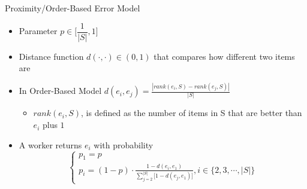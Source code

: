 \documentclass{beamer}
\begin{document}
\begin{frame}{Proximity/Order-Based Error Model}
\begin{itemize}
	\vspace{-5pt}
	\item Parameter $p \in \Bigg[ \dfrac{1}{\left\vert{S}\right\vert} , 1\Bigg]$
	\pause
	\vspace{5pt}
	\item Distance function $d(\cdot,\cdot) \in (0,1)$ that compares how different two items are
	\vspace{5pt}
	\item In Order-Based Model $d(e_i,e_j) = \frac{\left\vert{ rank(e_i, S)-rank(e_j, S) }\right\vert}{\left\vert{S}\right\vert}$
		\begin{itemize}
			 \item $rank(e_i, S)$, is defined as the number of items in S that are better than $e_i$ plus $1$
		\end{itemize}
\vspace{5pt}
\pause
\item A worker returns $e_i$ with probability
  \[
    \left\{
		\begin{array}{ll}
            p_1 = p\\
            p_i = (1-p) \cdot \frac{1-d(e_i, e_1)}{ \sum_{j=2}^{\left\vert{S}\right\vert} \big[ 1-d(e_j, e_1)\big] }, i \in \{2, 3, \cdots, \left\vert{S}\right\vert\}      
        \end{array}
    \right.
  \]
\end{itemize}
\end{frame}
\end{document}
